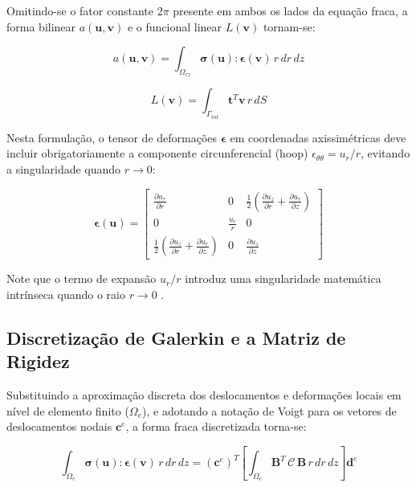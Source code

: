 Omitindo-se o fator constante $2\pi$ presente em ambos os lados da equação fraca, a forma bilinear $a(\mathbf{u}, \mathbf{v})$ e o funcional linear $L(\mathbf{v})$ tornam-se:

\begin{equation}
  a(\mathbf{u}, \mathbf{v}) = \int_{\Omega_{rz}} \boldsymbol{\sigma}(\mathbf{u}) : \boldsymbol{\epsilon}(\mathbf{v}) \, r \, dr \, dz
\end{equation}

\begin{equation}
  L(\mathbf{v}) = \int_{\Gamma_{int}} \mathbf{t}^T \mathbf{v} \, r \, dS
\end{equation}

Nesta formulação, o tensor de deformações $\mathbf{\epsilon}$ em coordenadas axissimétricas deve incluir obrigatoriamente a componente circunferencial (hoop) $\epsilon_{\theta\theta} = u_r / r$, evitando a singularidade quando $r \to 0$:

\begin{equation}
  \boldsymbol{\epsilon}(\mathbf{u}) = \begin{bmatrix}
    \frac{\partial u_r}{\partial r} & 0 & \frac{1}{2}\left(\frac{\partial u_z}{\partial r} + \frac{\partial u_r}{\partial z}\right) \\
    0 & \frac{u_r}{r} & 0 \\
    \frac{1}{2}\left(\frac{\partial u_z}{\partial r} + \frac{\partial u_r}{\partial z}\right) & 0 & \frac{\partial u_z}{\partial z}
  \end{bmatrix}
\end{equation}

Note que o termo de expansão $u_r/r$ introduz uma singularidade matemática intrínseca quando o raio $r \to 0$ \cite{Sadd2009}.

\subsection{Discretização de Galerkin e a Matriz de Rigidez}

Substituindo a aproximação discreta dos deslocamentos e deformações locais em nível de elemento finito ($\Omega_e$), e adotando a notação de Voigt para os vetores de deslocamentos nodais $\mathbf{c}^e$, a forma fraca discretizada torna-se:

\begin{equation}
  \int_{\Omega_e} \boldsymbol{\sigma}(\mathbf{u}) : \boldsymbol{\epsilon}(\mathbf{v}) \, r \, dr \, dz = (\mathbf{c}^e)^T \left[ \int_{\Omega_e} \mathbf{B}^T \, \mathbf{\mathcal{C}} \, \mathbf{B} \, r \, dr \, dz \right] \mathbf{d}^e
\end{equation}

